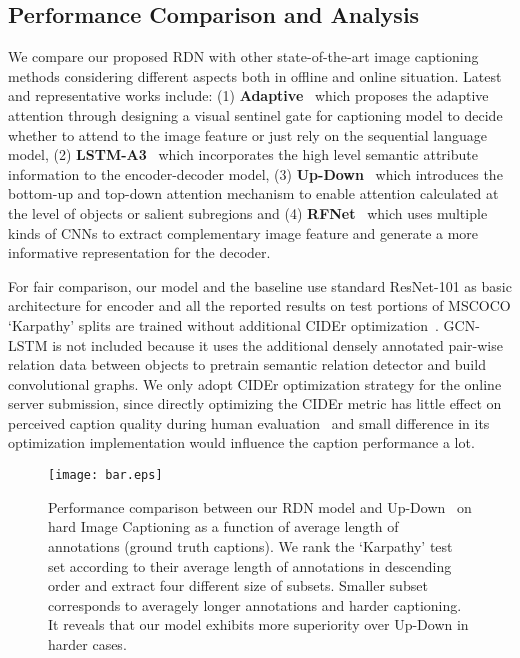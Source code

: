 \documentclass[10pt,twocolumn,letterpaper]{article}
\begin{document}
\subsection{Performance Comparison and Analysis}
\label{sec:performance}

We compare our proposed RDN with other state-of-the-art image captioning methods considering different aspects both in offline and online situation.
Latest and representative works include:
(1) \textbf{Adaptive}~\cite{lu2017knowing} which proposes the adaptive attention through designing a visual sentinel gate for captioning model to decide whether to attend to the image feature or just rely on the sequential language model,
(2) \textbf{LSTM-A3}~\cite{yao2017boosting} which incorporates the high level semantic attribute information to the encoder-decoder model,
(3) \textbf{Up-Down}~\cite{anderson2017bottom} which introduces the bottom-up and top-down attention mechanism  to enable attention calculated at the level of objects or salient subregions
and (4) \textbf{RFNet}~\cite{jiang2018recurrent} which uses multiple kinds of CNNs to extract complementary image feature and generate a more informative representation for the decoder.

For fair comparison, our model and the baseline use standard ResNet-101 as basic architecture for encoder and all the reported results on test portions of MSCOCO `Karpathy' splits are trained without additional CIDEr optimization~\cite{rennie2017self}.
GCN-LSTM \cite{yao2018exploring} is not included because it uses the additional densely annotated pair-wise relation data between objects to pretrain semantic relation detector and build convolutional graphs.
We only adopt CIDEr optimization strategy for the online server submission, since directly optimizing the CIDEr metric has little effect on perceived caption quality during human evaluation~\cite{liu2016optimization} and small difference in its optimization implementation would influence the caption performance a lot.


\begin{figure}[tb]
	\centering
\texttt{[image: bar.eps]}
\caption{Performance comparison between our RDN model and Up-Down~\cite{anderson2017bottom} on hard Image Captioning as a function of average length of annotations (ground truth captions). We rank the `Karpathy' test set according to their average length of annotations in descending order and extract four different size of subsets. Smaller subset corresponds to averagely longer annotations and harder captioning. It reveals that our model exhibits more superiority over Up-Down in harder cases. }
\label{fig:bar}
	\vspace{-0.25in}
\end{figure}
\end{document}
